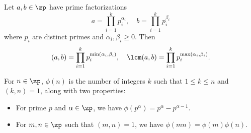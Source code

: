 \begin{note}
    Let $a, b \in \zp$ have prime factorizations
    \[
        a = \prod_{i=1}^k p_i^{\alpha_i}, \quad b = \prod_{i=1}^k p_i^{\beta_i}
    \]
    where $p_i$ are distinct primes and $\alpha_i, \beta_i \geq 0$. Then
    \[
        (a, b) = \prod_{i=1}^k p_i^{\min(\alpha_i, \beta_i)}, \quad \lcm(a, b) = \prod_{i=1}^k p_i^{\max(\alpha_i, \beta_i)}.
    \]
\end{note}

 For $n \in \zp$, $\phi(n)$ is the number of integers $k$ such that $1 \leq k \leq n$ and $(k, n) = 1$, along with two properties:
\begin{itemize}
    \item For prime $p$ and $\alpha \in \zp$, we have $\phi(p^\alpha) = p^\alpha - p^{\alpha - 1}$.
    \item For $m, n \in \zp$ such that $(m, n) = 1$, we have $\phi(mn) = \phi(m)\phi(n)$.
\end{itemize}